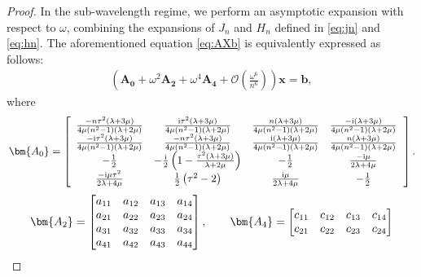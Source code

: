 \documentclass[11pt,reqno,twoside]{amsart}
\theoremstyle{definition}
\theoremstyle{remark}
\numberwithin{equation}{section}
\begin{document}
\begin{proof}
	In the sub-wavelength regime, we perform an asymptotic expansion with respect to \(\omega\), combining the expansions of \(J_n\) and \(H_n\) defined in \eqref{eq:jn} and \eqref{eq:hn}. The aforementioned equation \eqref{eq:AXb} is equivalently expressed as follows:
	\begin{align}\label{eq:xtzh}				\left(\bm{A_0}+\omega^{2}\bm{A_{2}}+\omega^{4}\bm{A_{4}}+\mathcal{O}\left(\frac{\omega^{6}}{n^{6}}\right)\right)\bm{x}=\bm{b},
	\end{align}
	where
	\begin{align}
		\left.\bm{A_0}=\left[\begin{array}{cccc}
			\frac{-n  \tau ^2 (\lambda +3 \mu )}{4 \mu  \left(n^2-1\right) (\lambda +2 \mu )} & \frac{\mathrm{i}  \tau ^2 (\lambda +3 \mu )}{4 \mu  \left(n^2-1\right) (\lambda +2 \mu )} & \frac{n  (\lambda +3 \mu )}{4 \mu  \left(n^2-1\right) (\lambda +2 \mu )} & \frac{-\mathrm{i}  (\lambda +3 \mu )}{4 \mu  \left(n^2-1\right) (\lambda +2 \mu )} \\
			\frac{-\mathrm{i}  \tau ^2 (\lambda +3 \mu )}{4 \mu  \left(n^2-1\right) (\lambda +2 \mu )} & \frac{-n  \tau ^2 (\lambda +3 \mu )}{4 \mu  \left(n^2-1\right) (\lambda +2 \mu )} & \frac{\mathrm{i}  (\lambda +3 \mu )}{4 \mu  \left(n^2-1\right) (\lambda +2 \mu )} & \frac{n  (\lambda +3 \mu )}{4 \mu  \left(n^2-1\right) (\lambda +2 \mu )} \\
			-\frac{1}{2} & -\frac{\mathrm{i}}{2}  \left(1-\frac{\tau ^2 (\lambda +3 \mu )}{\lambda +2 \mu }\right) & -\frac{1}{2} & \frac{-\mathrm{i} \mu }{2 \lambda +4 \mu } \\
			\frac{-\mathrm{i} \mu  \tau ^2}{2 \lambda +4 \mu } & \frac{1}{2} \left(\tau ^2-2\right) & \frac{\mathrm{i} \mu }{2 \lambda +4 \mu } & -\frac{1}{2} \\
		\end{array}\right.\right].\notag
	\end{align}
	\iffalse
	\begin{align}\notag
		\bm{A_{2}}=\begin{bmatrix}
			a_{11} & a_{12} & a_{13}& a_{14} \\
			a_{21} & a_{22} & a_{23}& a_{24} \\
			a_{31} & a_{32} & a_{33}& a_{34}\\
			a_{41} & a_{42} & a_{43}& a_{44}
		\end{bmatrix},\quad\quad
		\bm{A_{4}}=\begin{bmatrix}
			c_{11} & c_{12} & c_{13}& c_{14} \\
			c_{21} & c_{22} & c_{23}& c_{24} \\

\end{bmatrix}
\end{align}
\end{proof}
\end{document}
